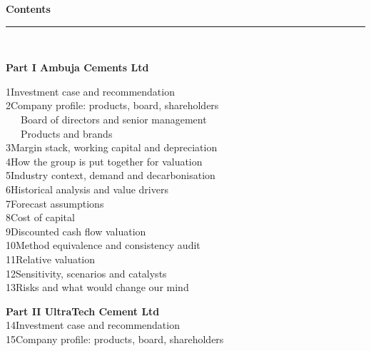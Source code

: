\vfill
{}
\newpage

\thispagestyle{empty}
{\color{navy}\Large\bfseries Contents}\\[2mm]
{\color{rule}\rule{\textwidth}{1.4pt}}\\[5mm]
\begin{minipage}[t]{0.48\textwidth}
{\bfseries\color{navy}Part I \quad Ambuja Cements Ltd}\\[2mm]
{\footnotesize
1\quad Investment case and recommendation\\
2\quad Company profile: products, board, shareholders\\
\quad\ \ \ Board of directors and senior management\\
\quad\ \ \ Products and brands\\
3\quad Margin stack, working capital and depreciation\\
4\quad How the group is put together for valuation\\
5\quad Industry context, demand and decarbonisation\\
6\quad Historical analysis and value drivers\\
7\quad Forecast assumptions\\
8\quad Cost of capital\\
9\quad Discounted cash flow valuation\\
10\quad Method equivalence and consistency audit\\
11\quad Relative valuation\\
12\quad Sensitivity, scenarios and catalysts\\
13\quad Risks and what would change our mind\par}
\vspace{6mm}
{\bfseries\color{navy}Part II \quad UltraTech Cement Ltd}\\[2mm]
{\footnotesize
14\quad Investment case and recommendation\\
15\quad Company profile: products, board, shareholders\\
}
\end{minipage}
